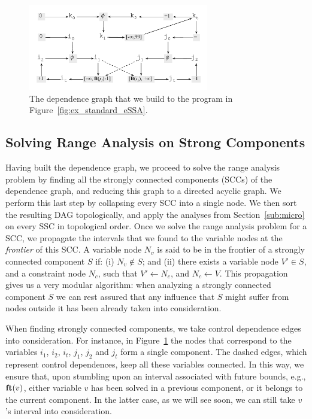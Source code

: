 \documentclass{llncs}
\newcommand{\fun}[1]{\mbox{\textbf{#1}}}
\begin{document}
\begin{figure}[t!]
\begin{center}
\includegraphics[width=0.7\textwidth]{images/ex_graph}
\end{center}
\caption{\label{fig:ex_graph}
The dependence graph that we build to the program in
Figure~\ref{fig:ex_standard_eSSA}.}
\end{figure}

\subsection{Solving Range Analysis on Strong Components}
\label{sub:macro}

Having built the dependence graph, we proceed to solve the range analysis
problem by finding all the strongly connected components (SCCs) of the
dependence graph, and reducing this graph to a directed acyclic graph.
We perform this last step by collapsing every SCC into a single node.
We then sort the resulting DAG topologically, and apply the analyses from
Section~\ref{sub:micro} on every SSC in topological order.
Once we solve the range analysis problem for a SCC, we propagate the
intervals that we found to the variable nodes at the {\em frontier} of this
SCC.
A variable node $N_v$ is said to be in the frontier of a strongly connected
component $S$ if:
(i) $N_v \notin S$; and
(ii) there exists a variable node $V' \in S$, and a constraint node $N_c$,
such that $V' \leftarrow N_c$, and $N_c \leftarrow V$.
This propagation gives us a very modular algorithm:
when analyzing a strongly connected component $S$ we can rest assured that
any influence that $S$ might suffer from nodes outside it has been already
taken into consideration.

When finding strongly connected components, we take control dependence
edges into consideration.
For instance, in Figure~\ref{fig:ex_graph} the nodes that correspond to the
variables $i_1$, $i_2$, $i_t$, $j_1$, $j_2$ and $j_t$ form a single component.
The dashed edges, which represent control dependences, keep all these variables
connected.
In this way, we ensure that, upon stumbling upon an interval associated with
future bounds, e.g., $\fun{ft}(v)$, either variable $v$ has been solved in a
previous component, or it belongs to the current component.
In the latter case, as we will see soon, we can still take $v$'s interval into
consideration.
\end{document}
